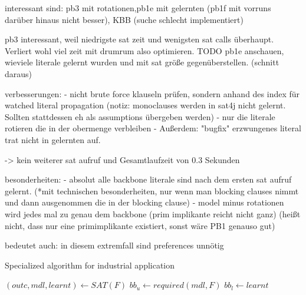 interessant sind: pb3 mit rotationen,pb1e mit gelernten (pb1f mit vorruns darüber hinaus nicht besser), KBB (suche schlecht implementiert)

pb3 interessant, weil niedrigste sat zeit und wenigsten sat calls überhaupt. Verliert wohl viel zeit mit drumrum also optimieren.
TODO pb1e anschauen, wieviele literale gelernt wurden und mit sat größe gegenüberstellen. (schnitt daraus)

verbesserungen:
- nicht brute force klauseln prüfen, sondern anhand des index für watched literal propagation (notiz: monoclauses werden in sat4j nicht gelernt. Sollten stattdessen eh als assumptions übergeben werden)
- nur die literale rotieren die in der obermenge verbleiben
- Außerdem: "bugfix" erzwungenes literal trat nicht in gelernten auf.

-> kein weiterer sat aufruf und Gesamtlaufzeit von 0.3 Sekunden

besonderheiten: 
- absolut alle backbone literale sind nach dem ersten sat aufruf gelernt. (*mit technischen besonderheiten, nur wenn man blocking clauses nimmt und dann ausgenommen die in der blocking clause)
- model minus rotationen wird jedes mal zu genau dem backbone (prim implikante reicht nicht ganz) (heißt nicht, dass nur eine primimplikante existiert, sonst wäre PB1 genauso gut) 

bedeutet auch: in diesem extremfall sind preferences unnötig

\begin{algorithm}
\caption{{\sc Specialized algorithm for industrial application}}
\DontPrintSemicolon
{}
$(outc,mdl,learnt) \gets SAT(F)$\;
$bb_u \gets required(mdl,F)$\;
$bb_l \gets learnt$\;
\label{alg:thoreSpecial}
\end{algorithm}